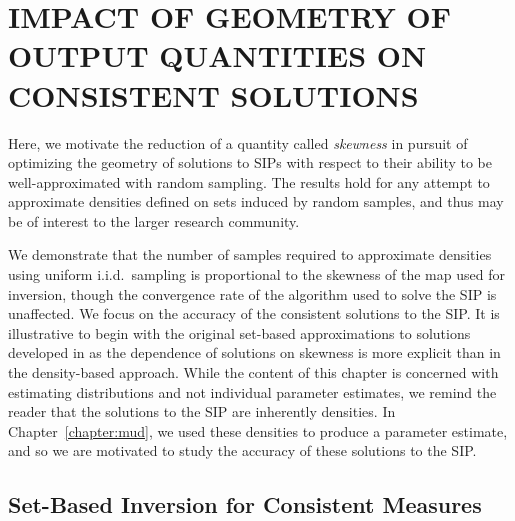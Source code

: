 \chapter{\uppercase{Impact of Geometry of Output Quantities on Consistent Solutions} \label{chapter:geometry}}

Here, we motivate the reduction of a quantity called \emph{skewness} in pursuit of optimizing the geometry of solutions to SIPs with respect to their ability to be well-approximated with random sampling.
The results hold for any attempt to approximate densities defined on sets induced by random samples, and thus may be of interest to the larger research community.



We demonstrate that the number of samples required to approximate densities using uniform i.i.d.~sampling is proportional to the skewness of the map used for inversion, though the convergence rate of the algorithm used to solve the SIP is unaffected.
We focus on the accuracy of the consistent solutions to the SIP.
It is illustrative to begin with the original set-based approximations to solutions developed in \cite{BGE+15, BET+14, MBD+15} as the dependence of solutions on skewness is more explicit than in the density-based approach.
While the content of this chapter is concerned with estimating distributions and not individual parameter estimates, we remind the reader that the solutions to the SIP are inherently densities.
In Chapter~\ref{chapter:mud}, we used these densities to produce a parameter estimate, and so we are motivated to study the accuracy of these solutions to the SIP.




\section{Set-Based Inversion for Consistent Measures}\label{sec:set-based}








